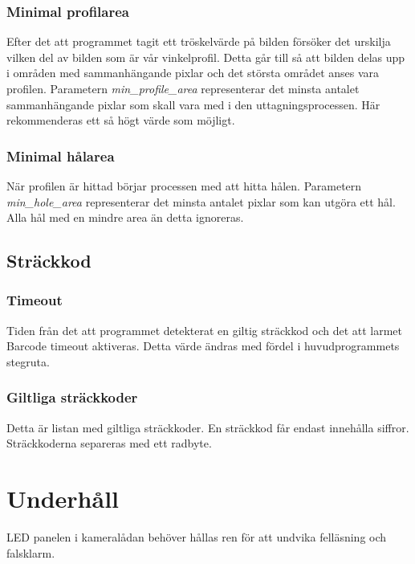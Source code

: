 \documentclass[a4paper]{article}
\begin{document}
	      \subsubsection{Minimal profilarea}\label{subsubsec:min_profile_area}
	  	Efter det att programmet tagit ett tröskelvärde på bilden försöker det urskilja vilken del av bilden som är vår vinkelprofil. 
		Detta går till så att bilden delas upp i områden med sammanhängande pixlar och det största området anses vara profilen. Parametern \textit{min\_profile\_area} representerar det
		minsta antalet sammanhängande pixlar som skall vara med i den uttagningsprocessen. Här rekommenderas ett så högt värde som möjligt.

	  \subsubsection{Minimal hålarea}
	  	När profilen är hittad börjar processen med att hitta hålen. Parametern \textit{min\_hole\_area} representerar det minsta antalet pixlar som kan utgöra ett hål.
		Alla hål med en mindre area än detta ignoreras.

	\subsection{Sträckkod}\label{subsec:barcode}
	  \subsubsection{Timeout}
	  	Tiden från det att programmet detekterat en giltig sträckkod och det att larmet Barcode timeout aktiveras. Detta värde ändras med fördel i huvudprogrammets stegruta.

	  \subsubsection{Giltliga sträckkoder}
	  	Detta är listan med giltliga sträckkoder. En sträckkod får endast innehålla siffror. Sträckkoderna separeras med ett radbyte.

\section{Underhåll}
	LED panelen i kameralådan behöver hållas ren för att undvika felläsning och falsklarm.
\end{document}
